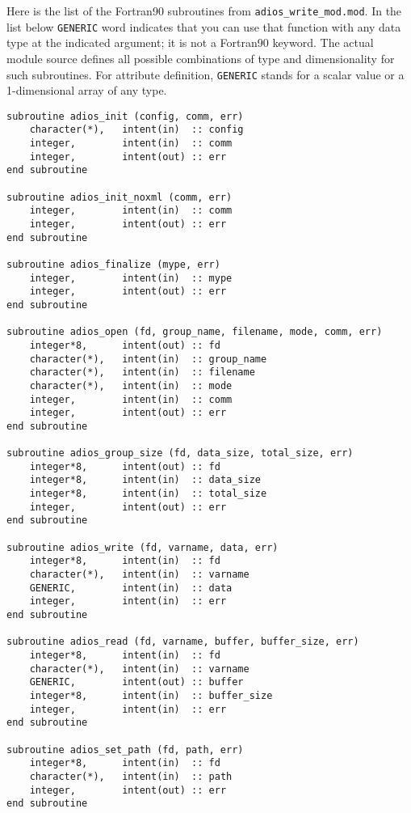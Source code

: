 Here is the list of the Fortran90 subroutines from \verb+adios_write_mod.mod+. 
In the list below \verb+GENERIC+ word indicates that you 
can use that function with any data type at the indicated argument; it is not
a Fortran90 keyword. The actual module source defines all possible combinations 
of type and dimensionality for such subroutines. For attribute definition, \verb+GENERIC+ 
stands for a scalar value or a 1-dimensional array of any type. 

\begin{lstlisting}[language=ADIOS,alsolanguage=Fortran]
subroutine adios_init (config, comm, err)
    character(*),   intent(in)  :: config
    integer,        intent(in)  :: comm
    integer,        intent(out) :: err
end subroutine

subroutine adios_init_noxml (comm, err)
    integer,        intent(in)  :: comm
    integer,        intent(out) :: err
end subroutine

subroutine adios_finalize (mype, err)
    integer,        intent(in)  :: mype
    integer,        intent(out) :: err
end subroutine

subroutine adios_open (fd, group_name, filename, mode, comm, err)
    integer*8,      intent(out) :: fd
    character(*),   intent(in)  :: group_name
    character(*),   intent(in)  :: filename
    character(*),   intent(in)  :: mode
    integer,        intent(in)  :: comm
    integer,        intent(out) :: err
end subroutine

subroutine adios_group_size (fd, data_size, total_size, err)
    integer*8,      intent(out) :: fd
    integer*8,      intent(in)  :: data_size
    integer*8,      intent(in)  :: total_size
    integer,        intent(out) :: err
end subroutine

subroutine adios_write (fd, varname, data, err)
    integer*8,      intent(in)  :: fd
    character(*),   intent(in)  :: varname
    GENERIC,        intent(in)  :: data
    integer,        intent(in)  :: err 
end subroutine

subroutine adios_read (fd, varname, buffer, buffer_size, err)
    integer*8,      intent(in)  :: fd
    character(*),   intent(in)  :: varname
    GENERIC,        intent(out) :: buffer
    integer*8,      intent(in)  :: buffer_size 
    integer,        intent(in)  :: err 
end subroutine

subroutine adios_set_path (fd, path, err)
    integer*8,      intent(in)  :: fd
    character(*),   intent(in)  :: path
    integer,        intent(out) :: err
end subroutine


\end{lstlisting}
